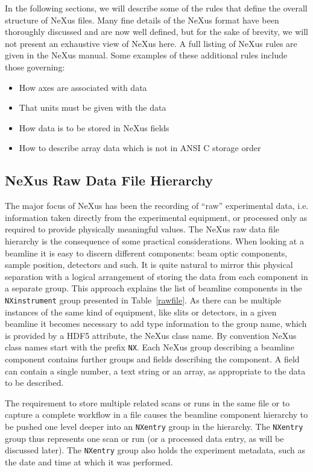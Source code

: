 \documentclass[%
 aip,
rsi,
 amsmath,amssymb,
 reprint,%
]{revtex4-1}
\begin{document}
In the following sections, we will describe some of the rules that define the overall structure of NeXus files. Many fine details 
of the NeXus format have been thoroughly discussed and are now well defined, but for the sake of brevity, we will not present an 
exhaustive view of NeXus here. A full listing of NeXus rules are given in the NeXus manual\cite{nxman}. Some examples of these 
additional rules include those governing:
\begin{itemize}
\item How axes are associated with data
\item That units must be given with the data
\item How data is to be stored in NeXus fields
\item How to describe array data which is not in ANSI C storage order
\end{itemize}



\subsection{NeXus Raw Data File Hierarchy}
The major focus of NeXus has been the recording of ``raw'' experimental data, i.e. information taken directly from the experimental 
equipment, or processed only as required to provide physically meaningful values.
The NeXus raw data file hierarchy is the consequence of some practical considerations. When looking at a beamline it is easy to 
discern different components: beam optic components, sample position, detectors and such. It is quite natural to mirror this physical 
separation with a logical arrangement of storing the data from each component in a separate group. This approach explains the 
list of beamline components in the \texttt{NXinstrument} group presented in Table~\ref{rawfile}. 
As there can be multiple instances of the same kind of equipment, like slits or detectors, in a given beamline it becomes necessary
to add type information to the group name,
which is provided by a HDF5 attribute, the NeXus class name.
By convention NeXus class names start 
with the prefix \texttt{NX}. Each NeXus group describing a beamline component contains further groups and fields describing the component. 
A field can contain a single number, a text string or an array, as appropriate to the data to be described.  

The requirement to store multiple related scans or runs  in the same file or to capture 
a complete workflow in a file causes the beamline component hierarchy to be pushed one level deeper into an \texttt{NXentry} 
group in the hierarchy. The \texttt{NXentry}  group thus represents one scan or run (or a processed data entry, as will be discussed later). 
The \texttt{NXentry} group also holds the experiment metadata, such as the date and time at which it was performed. 
\end{document}
